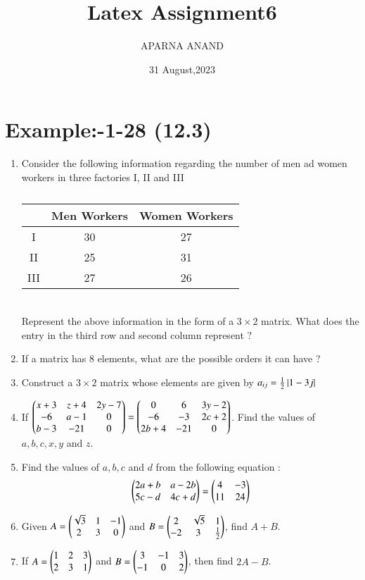 \documentclass{article}
\theoremstyle{remark}
\begin{document}
\title{Latex Assignment6}                            \author{APARNA ANAND}
\date{31 August,2023}
\maketitle
\section*{Example:-1-28 (12.3)}
\begin{enumerate}
\item Consider the following information regarding the number of men ad women workers in three factories I, II and III 
\begin{table}[ht!]
\centering
\begin{tabular}{|c|c|c|}
\hline
 & Men Workers & Women Workers\\
\hline
I &30&27\\
\hline
II  &25&31\\
\hline
III &27&26\\
\hline
\end{tabular}
\caption{}
\end{table}\\
Represent the above information in the form of a $3\times 2$ matrix. What does the entry in the third row and second column represent $?$
\item If a matrix has $8$ elements, what are the possible orders it can have ?
\item Construct a $3\times 2$ matrix whose elements are given by $a_{ij}= \frac{1}{2}\left\vert1-3j\right\vert$
\item If $\begin{pmatrix}x+3&z+4&2y-7\\-6&a-1&0\\b-3&-21&0\end{pmatrix}=\begin{pmatrix}0&6&3y-2\\-6&-3&2c+2\\2b+4&-21&0\end{pmatrix}$. Find the values of $a,b,c,x,y$ and $z$. 
\item Find the values of $a, b, c$ and $d$ from the following equation :
\begin{align} 
\begin{pmatrix}2a+b&a-2b\\5c-d&4c+d\end{pmatrix} = \begin{pmatrix}4&-3\\11&24\end{pmatrix} 
\end{align}
\item Given $A=\begin{pmatrix}\sqrt{3}&1&-1\\2&3&0\end{pmatrix}$ and $B=\begin{pmatrix}2&\sqrt{5}&1\\-2&3&\frac{1}{2}\end{pmatrix}$, find $A+B$.
\item If $A=\begin{pmatrix}1&2&3\\2&3&1\end{pmatrix}$ and $B=\begin{pmatrix}3&-1&3\\-1&0&2\end{pmatrix}$, then find $2A-B$.

\end{enumerate}
\end{document}
